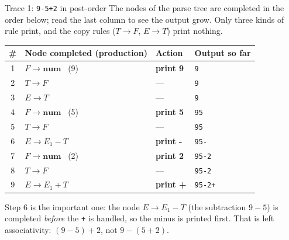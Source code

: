 \documentclass[11pt,a4paper]{article}
\begin{document}
\begin{examplebox}{Trace 1: \texttt{9-5+2} in post-order}
The nodes of the parse tree are completed in the order below; read the last column to see the output grow. Only three kinds of rule print, and the copy rules ($T\to F$, $E\to T$) print nothing.
\begin{center}
\small
\begin{tabular}{@{}c l l l@{}}
\toprule
\textbf{\#} & \textbf{Node completed (production)} & \textbf{Action} & \textbf{Output so far} \\ \midrule
1 & $F\to\mathbf{num}$ \ (9) & \textbf{print 9} & \texttt{9} \\
2 & $T\to F$ & --- & \texttt{9} \\
3 & $E\to T$ & --- & \texttt{9} \\
4 & $F\to\mathbf{num}$ \ (5) & \textbf{print 5} & \texttt{95} \\
5 & $T\to F$ & --- & \texttt{95} \\
6 & $E\to E_1-T$ & \textbf{print -} & \texttt{95-} \\
7 & $F\to\mathbf{num}$ \ (2) & \textbf{print 2} & \texttt{95-2} \\
8 & $T\to F$ & --- & \texttt{95-2} \\
9 & $E\to E_1+T$ & \textbf{print +} & \texttt{95-2+} \\ \bottomrule
\end{tabular}
\end{center}
Step 6 is the important one: the node $E\to E_1-T$ (the subtraction $9-5$) is completed \emph{before} the \texttt{+} is handled, so the minus is printed first. That is left associativity: $(9-5)+2$, not $9-(5+2)$.
\end{examplebox}
\end{document}
